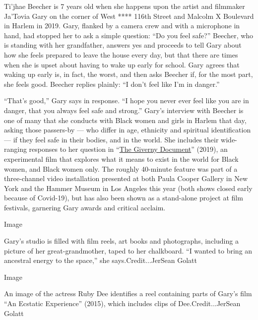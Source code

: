 Ti'jhae Beecher is 7 years old when she happens upon the artist and
filmmaker Ja'Tovia Gary on the corner of West **** 116th Street and
Malcolm X Boulevard in Harlem in 2019. Gary, flanked by a camera crew
and with a microphone in hand, had stopped her to ask a simple question:
``Do you feel safe?'' Beecher, who is standing with her grandfather,
answers yes and proceeds to tell Gary about how she feels prepared to
leave the house every day, but that there are times when she is upset
about having to wake up early for school. Gary agrees that waking up
early is, in fact, the worst, and then asks Beecher if, for the most
part, she feels good. Beecher replies plainly: ``I don't feel like I'm
in danger.''

``That's good,'' Gary says in response. ``I hope you never ever feel
like you are in danger, that you always feel safe and strong.'' Gary's
interview with Beecher is one of many that she conducts with Black women
and girls in Harlem that day, asking those passers-by --- who differ in
age, ethnicity and spiritual identification --- if they feel safe in
their bodies, and in the world. She includes their wide-ranging
responses to her question in
``\href{https://www.jatovia.com/the-giverny-document-2019\#1}{The
Giverny Document}'' (2019), an experimental film that explores what it
means to exist in the world for Black women, and Black women only. The
roughly 40-minute feature was part of a three-channel video installation
presented at both Paula Cooper Gallery in New York and the Hammer Museum
in Los Angeles this year (both shows closed early because of Covid-19),
but has also been shown as a stand-alone project at film festivals,
garnering Gary awards and critical acclaim.

Image

Gary's studio is filled with film reels, art books and photographs,
including a picture of her great-grandmother, taped to her chalkboard.
``I wanted to bring an ancestral energy to the space,'' she
says.Credit...JerSean Golatt

Image

An image of the actress Ruby Dee identifies a reel containing parts of
Gary's film ``An Ecstatic Experience'' (2015), which includes clips of
Dee.Credit...JerSean Golatt


